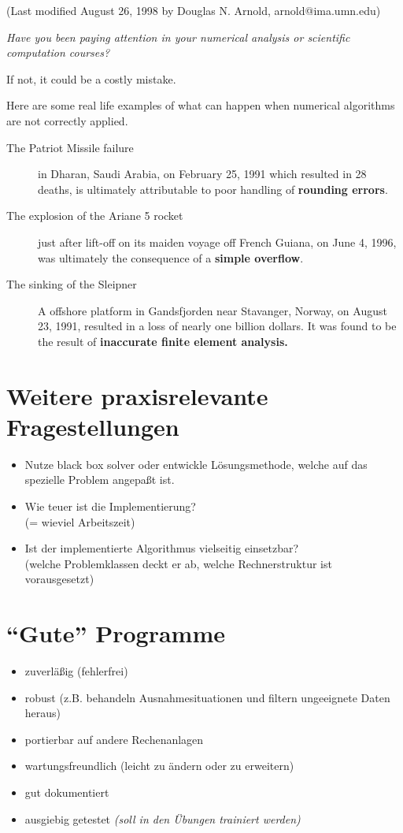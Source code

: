 {\small	(Last modified August 26, 1998 by Douglas N. Arnold,
  arnold@ima.umn.edu)}

{\itshape Have you been paying attention in your numerical analysis or
  scientific computation courses? 
  
  If not, it could be a costly
  mistake. 
  
  Here are some real life examples of what can happen when
  numerical algorithms are not correctly applied.}

\begin{description}
\item[The Patriot Missile failure] in Dharan, Saudi Arabia, on
  February 25, 1991 which resulted in 28 deaths, is ultimately
  attributable to poor handling of \textbf{rounding errors}. 
  
\item[The explosion of the Ariane 5 rocket] just after lift-off on its
  maiden voyage off French Guiana, on June 4, 1996, was ultimately the
  consequence of a \textbf{simple overflow}. 
  
\item[The sinking of the Sleipner] A offshore platform in Gandsfjorden near
  Stavanger, Norway, on August 23, 1991, resulted in a loss of nearly
  one billion dollars. It was found to be the result of
  \textbf{inaccurate finite element analysis.} 
\end{description}

\section*{Weitere praxisrelevante Fragestellungen}
\begin{itemize}
\item Nutze black box solver oder entwickle Lösungsmethode,
  welche auf das spezielle Problem angepaßt ist.
\item Wie teuer ist die Implementierung? \\(= wieviel Arbeitszeit)
\item Ist der implementierte Algorithmus vielseitig einsetzbar?\\
  (welche Problemklassen deckt er ab, welche Rechnerstruktur ist
  vorausgesetzt)
\end{itemize}

\section*{\enquote{Gute} Programme}
\begin{itemize}
\item zuverläßig (fehlerfrei)
\item robust (z.B. behandeln Ausnahmesituationen und filtern
  ungeeignete Daten heraus)
\item portierbar auf andere Rechenanlagen
\item wartungsfreundlich (leicht zu ändern oder zu erweitern)
\item gut dokumentiert
\item ausgiebig getestet 
  {\small \itshape (soll in den Übungen trainiert werden)}
\end{itemize}

